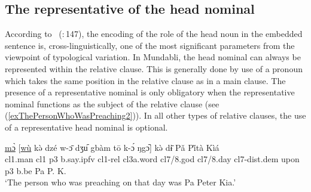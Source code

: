 \documentclass[10pt,twoside]{article}
\newcommand{\gl}[1]{`#1'}
\def\VSP{\vspace{0pt}}
\newcommand{\cl}[1]{{\sc cl#1}}
\newcommand{\citepage}[2]{\citeauthor{#1}~{(\citeyear{#1}:\,{#2})}}
\newcommand{\pref}[1]{(\ref{#1})}
\newcommand{\comment}[1]{\textcolor{blue}{\emph{#1}}}
\begin{document}
\subsection{The representative of the head nominal}\label{secMundabliRepresentativeNominal}
%
%

According to \citepage{Keenan:1985}{147}, the encoding of the role of the head noun in the 
embedded sentence is, cross-linguistically, one of the most significant parameters from 
the viewpoint of typological variation. 
In Mundabli, the head nominal can always be represented within the relative clause. This is generally done by use 
of a pronoun which takes the same position in the relative clause as in a main clause. The presence of 
a representative nominal is only obligatory when the representative nominal functions as the 
subject of the relative clause (see \pref{exThePersonWhoWasPreaching2}).
In all other types of relative clauses, the use of a representative head nominal is optional.

\begin{exe}
	\ex \label{exThePersonWhoWasPreaching2} 		
		\gll \uline{mɔ̀} [\uline{wù} kə̀ dzé w-ɔ̄ dʒu᷇ gbàm tō k-ɔ́ ŋgɔ᷆] kə̀ dɨ̄ Pǎ Pi̋tà Kìá\\
		\cl1.man	\cl1 	{\sc p3}	b.say.{\sc ipfv}	\cl1-{\sc rel}	\cl3a.word \cl7/8.god	\cl7/8.day	\cl7-{\sc dist.dem}	 upon	{\sc p3}	b.be	Pa P. K. \\
		\glt \VSP \gl{The person who was preaching on that day was Pa Peter Kia.}
\end{exe}%
\end{document}
